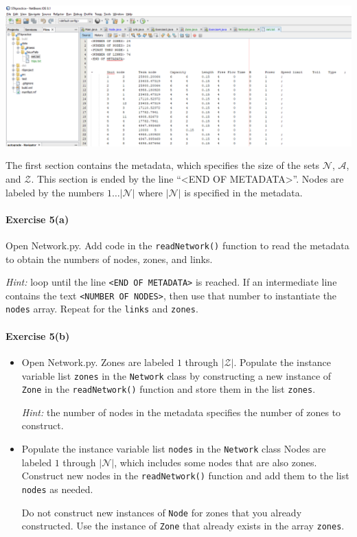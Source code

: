 \documentclass[11pt]{article}
\newcommand{\N}{\mathcal{N}}
\newcommand{\A}{\mathcal{A}}
\newcommand{\Z}{\mathcal{Z}}
\begin{document}
\begin{center}
	\includegraphics[width=\textwidth]{netbeans6.png}
\end{center}


\noindent The first section contains the metadata, which specifies the size of the sets $\N$, $\A$, and $\Z$. This section is ended by the line ``<END OF METADATA>''. Nodes are labeled by the numbers $1\ldots \vert\N\vert$ where $\vert\N\vert$ is specified in the metadata. 




\paragraph*{Exercise 5(a)} Open Network.py. Add code in the \texttt{readNetwork()} function to read the metadata to obtain the numbers of nodes, zones, and links.

\textit{Hint:} loop until the line \texttt{<END OF METADATA>} is reached. If an intermediate line contains the text \texttt{<NUMBER OF NODES>}, then use that number to instantiate the \texttt{nodes} array. Repeat for the \texttt{links} and \texttt{zones}. 


\paragraph*{Exercise 5(b)} 

 \begin{itemize}
 	\item Open Network.py. Zones are labeled $1$ through $\vert \Z \vert$. Populate the instance variable list \texttt{zones} in the \texttt{Network} class by constructing a new instance of \texttt{Zone} in the  \texttt{readNetwork()} function and store them in the list \texttt{zones}.
 	
 	\textit{Hint:} the number of nodes in the metadata specifies the number of zones to construct.
 	
 	\item Populate the instance variable list \texttt{nodes}  in the \texttt{Network} class Nodes are labeled $1$ through $\vert \N \vert$, which includes some nodes that are also zones. Construct new nodes in the  \texttt{readNetwork()} function and add them to the list \texttt{nodes} as needed. 
 	
 	Do not construct new instances of \texttt{Node} for  zones that you already constructed. Use the instance of \texttt{Zone} that already exists in the array \texttt{zones}. 
 \end{itemize} 
\end{document}
